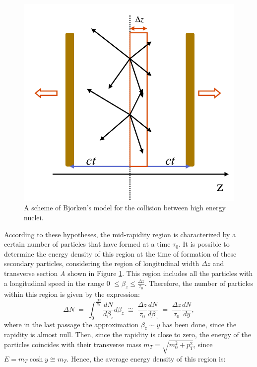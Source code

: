 \begin{figure}
  \centering
  \includegraphics[scale=0.3]{figures/bjorken.png}
  \caption{A scheme of Bjorken's model for the collision between high energy nuclei.}
  \label{fig:bjor}
\end{figure}
%
According to these hypotheses, the mid-rapidity region is characterized by a certain number of particles that have formed at a time $\tau_{0}$. It is possible to determine the energy density of this region at the time of formation of these secondary particles, considering the region of longitudinal width $\Delta z$ and transverse section \textit{A} shown in Figure \ref{fig:bjor}. This region includes all the particles with a longitudinal speed in the range 0 $\leq \beta_{z} \leq \frac{\Delta z}{\tau_{0}}$. Therefore, the number of particles within this region is given by the expression:
\begin{equation}
 \Delta N \;=\; \int_{0}^{\frac{\Delta z}{\tau_{0}}} \frac{dN}{d\beta_{z}}d\beta_{z}\;\cong\;\frac{\Delta z}{\tau_{0}}\frac{dN}{d\beta_{z}}\;=\;\frac{\Delta z}{\tau_{0}}\frac{dN}{dy},
\end{equation}
where in the last passage the approximation $\beta_{z}\sim y$ has been done, since the rapidity is almost null. Then, since the rapidity is close to zero, the energy of the particles coincides with their transverse mass $m_{T} = \sqrt{m_{0}^{2} + p_{T}^{2}}$, since $E = m_{T} \cosh y \cong  m_{T}$. Hence, the average energy density of this region is:
